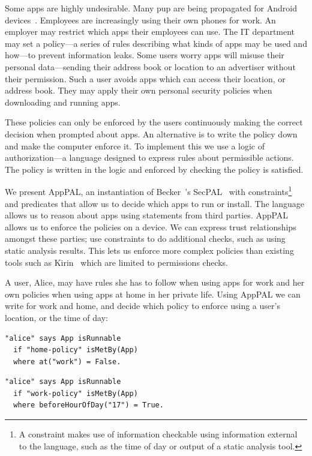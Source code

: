 \documentclass[]{llncs}
\begin{document}
Some apps are highly undesirable.
Many \ac{pup} are being propagated for Android devices~\cite{Truong:2014bi,Svajcer:2013tp}.
Employees are increasingly using their own phones for work.
An employer may restrict which apps their employees can use.
The IT department may set a policy---a series of rules describing what kinds of apps may be used and how---to prevent information leaks.
Some users worry apps will misuse their personal data---sending their address book or location to an advertiser without their permission.
Such a user avoids apps which can access their location, or address book.
They may apply their own personal security policies when downloading and running apps.

These policies can only be enforced by the users continuously making the correct decision when prompted about apps.
An alternative is to write the policy down and make the computer enforce it.
To implement this we use a logic of authorization---a language designed to express rules about permissible actions.
The policy is written in the logic and enforced by checking the policy is satisfied.

We present AppPAL, an instantiation of Becker~\etal's SecPAL~\cite{Becker:2006vh} with constraints\footnote{A constraint makes use of information checkable using information external to the language, such as the time of day or output of a static analysis tool.} and predicates that allow us to decide which apps to run or install.
The language allows us to reason about apps using statements from third parties.
AppPAL allows us to enforce the policies on a device.
We can express trust relationships amongst these parties; use constraints to do additional checks, such as using static analysis results.
This lets us enforce more complex policies than existing tools such as Kirin~\cite{Enck:2009ko} which are limited to permissions checks.

A user, Alice, may have rules she has to follow when using apps for work and her own policies when using apps at home in her private life.
Using AppPAL we can write for work and home, and decide which policy to enforce using a user's location, or the time of day:

\noindent
\begin{minipage}{\linewidth}
  \begin{minipage}{0.5\linewidth}
    \begin{lstlisting}
"alice" says App isRunnable
  if "home-policy" isMetBy(App)
  where at("work") = False.
    \end{lstlisting}
  \end{minipage}
  \begin{minipage}{0.5\linewidth}
    \begin{lstlisting}
"alice" says App isRunnable
  if "work-policy" isMetBy(App)
  where beforeHourOfDay("17") = True.
    \end{lstlisting}
  \end{minipage}
\end{minipage}
\end{document}
